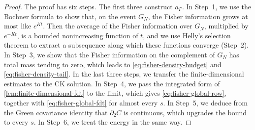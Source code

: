 \begin{proof}
The proof has six steps. The first three construct $a_F$. In Step~1, we use the Bochner formula to show that, on the event $G_N$, the Fisher information grows at most like $e^{Kt}$. Then the average of the Fisher information over $G_N$, multiplied by $e^{-Kt}$, is a bounded nonincreasing function of $t$, and we use Helly's selection theorem to extract a subsequence along which these functions converge (Step~2). In Step~3, we show that the Fisher information on the complement of $G_N$ has total mass tending to zero, which leads to \eqref{eq:fisher-density-budget} and \eqref{eq:fisher-density-tail}. In the last three steps, we transfer the finite-dimensional estimates to the CK solution. In Step~4, we pass the integrated form of \cref{lem:finite-dimensional-fdt} to the limit, which gives \eqref{eq:fisher-global-row}, together with \eqref{eq:fisher-global-fdt} for almost every $s$. In Step~5, we deduce from the Green covariance identity that $\partial_2C$ is continuous, which upgrades the bound to every $s$. In Step~6, we treat the energy in the same way.


\end{proof}
